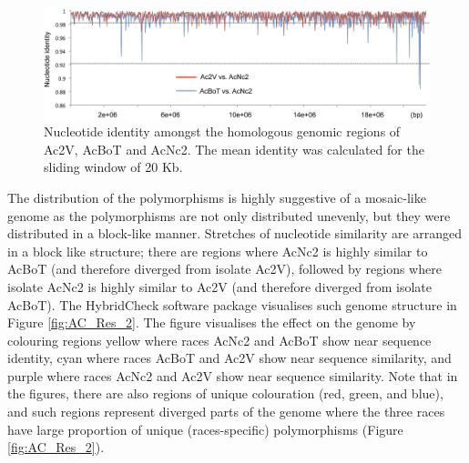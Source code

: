 \begin{figure}
\includegraphics{Figures/AlbugoCandida/AC_Figure1}
\caption{Nucleotide identity amongst the homologous genomic regions of Ac2V, AcBoT and AcNc2. The mean identity was calculated for the sliding window of 20 Kb.\label{fig:AC_Res_1}}
\end{figure}

The distribution of the polymorphisms is highly suggestive of a mosaic-like genome as the polymorphisms are not only distributed unevenly, but they were distributed in a block-like manner.
Stretches of nucleotide similarity are arranged in a block like structure; there are regions where AcNc2 is highly similar to AcBoT (and therefore diverged from isolate Ac2V), followed by regions where isolate AcNc2 is highly similar to Ac2V (and therefore diverged from isolate AcBoT).
The HybridCheck software package visualises such genome structure in Figure \ref{fig:AC_Res_2}. The figure visualises the effect on the genome by colouring regions yellow where races AcNc2 and AcBoT show near sequence identity, cyan where races AcBoT and Ac2V show near sequence similarity, and purple where races AcNc2 and Ac2V show near sequence similarity.
Note that in the figures, there are also regions of unique colouration (red, green, and blue), and such regions represent diverged parts of the genome where the three races have large proportion of unique (races-specific) polymorphisms (Figure \ref{fig:AC_Res_2}).

